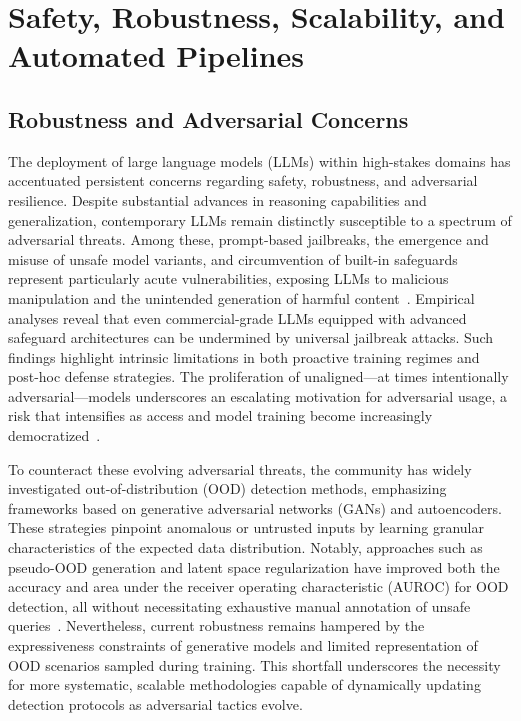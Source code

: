 \section{Safety, Robustness, Scalability, and Automated Pipelines}

\subsection{Robustness and Adversarial Concerns}

The deployment of large language models (LLMs) within high-stakes domains has accentuated persistent concerns regarding safety, robustness, and adversarial resilience. Despite substantial advances in reasoning capabilities and generalization, contemporary LLMs remain distinctly susceptible to a spectrum of adversarial threats. Among these, prompt-based jailbreaks, the emergence and misuse of unsafe model variants, and circumvention of built-in safeguards represent particularly acute vulnerabilities, exposing LLMs to malicious manipulation and the unintended generation of harmful content~\cite{ref78,ref82}. Empirical analyses reveal that even commercial-grade LLMs equipped with advanced safeguard architectures can be undermined by universal jailbreak attacks. Such findings highlight intrinsic limitations in both proactive training regimes and post-hoc defense strategies. The proliferation of unaligned—at times intentionally adversarial—models underscores an escalating motivation for adversarial usage, a risk that intensifies as access and model training become increasingly democratized~\cite{ref78}.

To counteract these evolving adversarial threats, the community has widely investigated out-of-distribution (OOD) detection methods, emphasizing frameworks based on generative adversarial networks (GANs) and autoencoders. These strategies pinpoint anomalous or untrusted inputs by learning granular characteristics of the expected data distribution. Notably, approaches such as pseudo-OOD generation and latent space regularization have improved both the accuracy and area under the receiver operating characteristic (AUROC) for OOD detection, all without necessitating exhaustive manual annotation of unsafe queries~\cite{ref82}. Nevertheless, current robustness remains hampered by the expressiveness constraints of generative models and limited representation of OOD scenarios sampled during training. This shortfall underscores the necessity for more systematic, scalable methodologies capable of dynamically updating detection protocols as adversarial tactics evolve.

